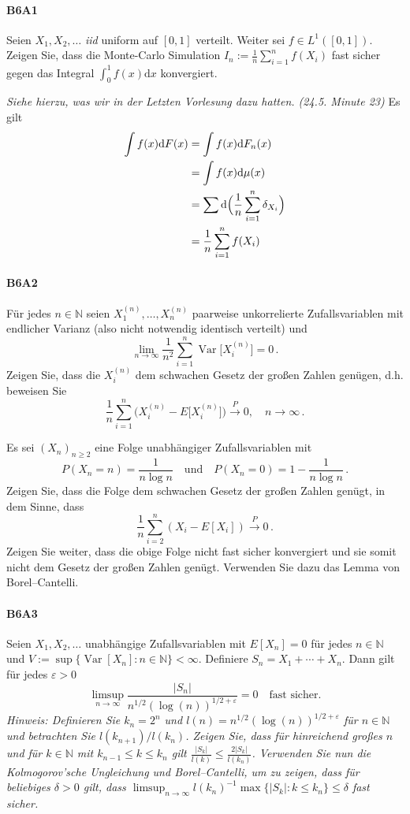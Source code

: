 \documentclass{article}
\begin{document}
\paragraph{B6A1}
Seien $X_1,X_2,\dots$ \emph{iid} uniform auf $[0,1]$ verteilt.
Weiter sei $f\in L^1([0,1])$.
Zeigen Sie, dass die Monte-Carlo Simulation $\hat{I}_n:=\frac{1}{n}\sum_{i=1}^nf(X_i)$ fast sicher gegen das Integral $\int_0^1f(x)\mathrm{d}x$ konvergiert.

\emph{Siehe hierzu, was wir in der Letzten Vorlesung dazu hatten. (24.5. Minute 23)}
Es gilt
\begin{align*}
  \int f(x)\mathrm{d}F(x)
  &=\int f(x)\mathrm{d}F_n(x)\\
  &=\int f(x)\mathrm{d}\mu(x)\\
  &=\sum\mathrm{d}\Bigl(\frac{1}{n}\sum_{i=1}^n\delta_{X_i}\Bigr)\\
  &=\frac{1}{n}\sum_{i=1}^n f(X_i)
\end{align*}

\newpage

\paragraph{B6A2}
Für jedes $n\in\mathbb{N}$ seien $X_1^{(n)},\dots,X_n^{(n)}$ paarweise unkorrelierte Zufallsvariablen mit endlicher Varianz (also nicht notwendig identisch verteilt) und
\[
\lim_{n\to\infty}\frac{1}{n^2}\sum_{i=1}^n\operatorname{Var}\bigl[X_i^{(n)}\bigr]=0\,.
\]
Zeigen Sie, dass die $X_i^{(n)}$ dem schwachen Gesetz der großen Zahlen genügen, d.h. beweisen Sie
\[
\frac{1}{n}\sum_{i=1}^n\bigl(X_i^{(n)}-E\bigl[X_i^{(n)}\bigr]\bigr)\xrightarrow{P}0,\quad n\to\infty\,.
\]

Es sei $(X_n)_{n\geq2}$ eine Folge unabhängiger Zufallsvariablen mit
\[
P(X_n=n)=\frac{1}{n\log n}\quad\text{und}\quad P(X_n=0)=1-\frac{1}{n\log n}\,.
\]
Zeigen Sie, dass die Folge dem schwachen Gesetz der großen Zahlen genügt, in dem Sinne, dass
\[
\frac{1}{n}\sum_{i=2}^n(X_i-E[X_i])\xrightarrow{P}0\,.
\]
Zeigen Sie weiter, dass die obige Folge nicht fast sicher konvergiert und sie somit nicht dem Gesetz der großen Zahlen genügt.
Verwenden Sie dazu das Lemma von Borel--Cantelli.
\newpage

\paragraph{B6A3}
Seien $X_1,X_2,\dots$ unabhängige Zufallsvariablen mit $E[X_n]=0$ für jedes $n\in\mathbb{N}$ und $V:=\sup\{\operatorname{Var}[X_n]:n\in\mathbb{N}\}<\infty$.
Definiere $S_n=X_1+\cdots+X_n$.
Dann gilt für jedes $\varepsilon>0$
\[
  \limsup_{n\to\infty}\frac{|S_n|}{n^{1/2}(\log(n))^{1/2+\varepsilon}}=0\quad\text{fast sicher.}
\]
\emph{Hinweis: Definieren Sie $k_n=2^n$ und $l(n)=n^{1/2}(\log(n))^{1/2+\varepsilon}$ für $n\in\mathbb{N}$ und betrachten Sie $l(k_{n+1})/l(k_n)$.
  Zeigen Sie, dass für hinreichend großes $n$ und für $k\in\mathbb{N}$ mit $k_{n-1}\leq k\leq k_n$ gilt $\frac{|S_k|}{l(k)}\leq\frac{2|S_k|}{l({k_n})}$.
Verwenden Sie nun die Kolmogorov'sche Ungleichung und Borel--Cantelli, um zu zeigen, dass für beliebiges $\delta>0$ gilt, dass $\limsup_{n\to\infty}l(k_n)^{-1}\max\{|S_k|: k\leq k_n\}\leq\delta$ fast sicher.}
\newpage
\end{document}
